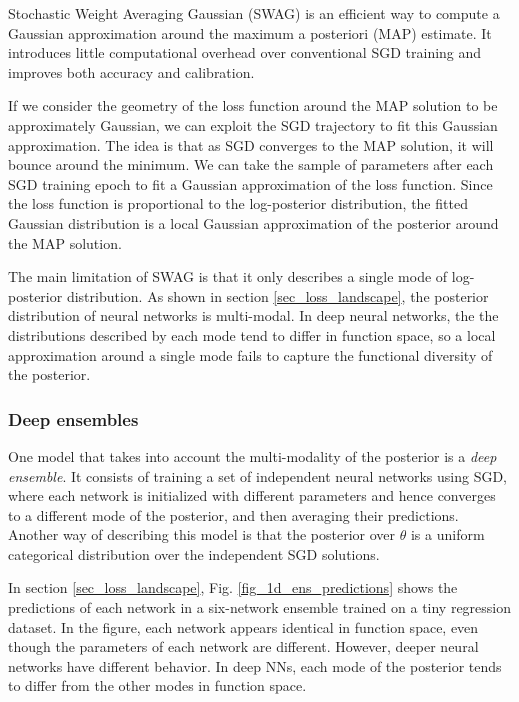 \documentclass[12pt]{article}
\begin{document}
{Stochastic Weight Averaging Gaussian (SWAG) is an efficient way to compute a Gaussian approximation around the maximum a posteriori (MAP) estimate. \cite{swag} It introduces little computational overhead over conventional SGD training and improves both accuracy and calibration. \cite{swag}

If we consider the geometry of the loss function around the MAP solution to be approximately Gaussian, we can exploit the SGD trajectory to fit this Gaussian approximation. The idea is that as SGD converges to the MAP solution, it will bounce around the minimum. We can take the sample of parameters after each SGD training epoch to fit a Gaussian approximation of the loss function. Since the loss function is proportional to the log-posterior distribution, the fitted Gaussian distribution is a local Gaussian approximation of the posterior around the MAP solution.

The main limitation of SWAG is that it only describes a single mode of log-posterior distribution. As shown in section \ref{sec_loss_landscape}, the posterior distribution of neural networks is multi-modal. In deep neural networks, the the distributions described by each mode tend to differ in function space, so a local approximation around a single mode fails to capture the functional diversity of the posterior. \cite{deep_ens}

\subsubsection{Deep ensembles}

One model that takes into account the multi-modality of the posterior is a \textit{deep ensemble}. It consists of training a set of independent neural networks using SGD, where each network is initialized with different parameters and hence converges to a different mode of the posterior, and then averaging their predictions. Another way of describing this model is that the posterior over $\theta$ is a uniform categorical distribution over the independent SGD solutions.

In section \ref{sec_loss_landscape}, Fig. \ref{fig_1d_ens_predictions} shows the predictions of each network in a six-network ensemble trained on a tiny regression dataset. In the figure, each network appears identical in function space, even though the parameters of each network are different. However, deeper neural networks have different behavior. In deep NNs, each mode of the posterior tends to differ from the other modes in function space. \cite{deep_ens}

}
\end{document}
